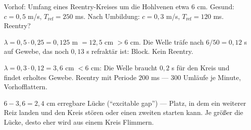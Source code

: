 \begin{aufgabe}
Vorhof: Umfang eines Reentry-Kreises um die Hohlvenen etwa $6$ cm. Gesund: $c = 0{,}5$ m/s, $T_{\mathrm{ref}} = 250$ ms. Nach Umbildung: $c = 0{,}3$ m/s, $T_{\mathrm{ref}} = 120$ ms. Reentry?

\loesung
{}
$\lambda = 0{,}5\cdot0{,}25 = 0{,}125$ m $= 12{,}5$ cm $> 6$ cm. Die Welle träfe nach $6/50 = 0{,}12$ s auf Gewebe, das noch $0{,}13$ s refraktär ist: Block. Kein Reentry.

$\lambda = 0{,}3\cdot0{,}12 = 3{,}6$ cm $< 6$ cm: Die Welle braucht $0{,}2$ s für den Kreis und findet erholtes Gewebe. Reentry mit Periode $200$ ms --- $300$ Umläufe je Minute, Vorhofflattern.

$6 - 3{,}6 = 2{,}4$ cm erregbare Lücke (\enquote{excitable gap}) --- Platz, in dem ein weiterer Reiz landen und den Kreis stören oder einen zweiten starten kann. Je größer die Lücke, desto eher wird aus einem Kreis Flimmern.

\begin{center}
\begin{minipage}{0.88\textwidth}
\end{minipage}
\end{center}
\end{aufgabe}

